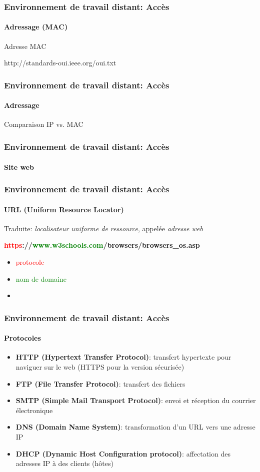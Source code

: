 \documentclass{beamer}
\begin{document}
\begin{frame}
\frametitle{Environnement de travail distant: Accès}
\framesubtitle{Adressage (MAC)}

Adresse MAC

http://standards-oui.ieee.org/oui.txt



\end{frame}

\begin{frame}
\frametitle{Environnement de travail distant: Accès}
\framesubtitle{Adressage}

Comparaison IP vs. MAC



\end{frame}


\begin{frame}
\frametitle{Environnement de travail distant: Accès}
\framesubtitle{Site web}



\end{frame}


\begin{frame}
\frametitle{Environnement de travail distant: Accès}
\framesubtitle{URL (Uniform Resource Locator)}

Traduite: \textit{localisateur uniforme de ressource}, appelée \textit{adresse web}

{\huge \bfseries \textcolor{red}{https}://\textcolor{green}{www.w3schools.com}/browsers/browsers\_os.asp}

\begin{itemize}
	\item \textcolor{red}{protocole}
	\item \textcolor{green}{nom de domaine}
	\item 
\end{itemize}

\end{frame}


\begin{frame}
\frametitle{Environnement de travail distant: Accès}
\framesubtitle{Protocoles}

\begin{itemize}
	\item \textbf{HTTP (Hypertext Transfer Protocol)}: transfert hypertexte pour naviguer sur le web  (HTTPS pour la
	version sécurisée)
	\item \textbf{FTP (File Transfer Protocol)}: transfert des fichiers
	\item \textbf{SMTP (Simple Mail Transport Protocol)}: envoi et réception du courrier électronique
	\item \textbf{DNS (Domain Name System)}: transformation d'un URL vers une adresse IP
	\item \textbf{DHCP (Dynamic Host Configuration protocol)}: affectation des adresses IP à des clients (hôtes)
\end{itemize}

\end{frame}
\end{document}
